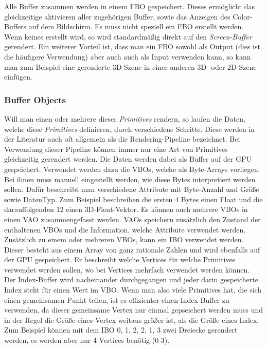 Alle Buffer zusammen werden in einem \ac{FBO} gespeichert. Dieses ermöglicht das gleichzeitige aktivieren aller zugehörigen Buffer, sowie das Anzeigen des Color-Buffers auf dem Bildschirm. Es muss nicht speziell ein \ac{FBO} erstellt werden. Wenn keines erstellt wird, so wird standardmäßig direkt auf den \textit{Screen-Buffer} gerendert. Ein weiterer Vorteil ist, dass man ein \ac{FBO} sowohl als Output (dies ist die häufigere Verwendung) aber auch auch als Input verwenden kann, so kann man zum Beispiel eine gerenderte 3D-Szene in einer anderen 3D- oder 2D-Szene einfügen.  

\subsubsection{Buffer Objects}
Will man einen oder mehrere dieser \textit{Primitives} rendern, so laufen die Daten, welche diese \textit{Primitives} definieren, durch verschiedene Schritte. Diese werden in der Literatur auch oft allgemein als die Rendering-Pipeline bezeichnet. Bei Verwendung dieser Pipeline können immer nur eine Art von Primitives gleichzeitig gerendert werden.
Die Daten werden dabei als Buffer auf der \ac{GPU} gespeichert. Verwendet werden dazu die \acp{VBO}, welche als Byte-Arrays vorliegen. Bei ihnen muss manuell eingestellt werden, wie diese Bytes interpretiert werden sollen. Dafür beschreibt man verschiedene Attribute mit Byte-Anzahl und Größe sowie DatenTyp. Zum Beispiel beschreiben die ersten 4 Bytes einen Float und die darauffolgenden 12 einen 3D-Float-Vektor. Es können auch mehrere \ac{VBO}s in einen \ac{VAO} zusammengefasst werden. \acp{VAO} speichern zusätzlich den Zustand der enthaltenen \acp{VBO} und die Information, welche Attribute verwendet werden. Zusätzlich zu einem oder mehreren \acp{VBO}, kann ein \ac{IBO} verwendet werden. Dieser besteht aus einem Array von ganz rationale Zahlen und wird ebenfalls auf der \ac{GPU} gespeichert. 
Er beschreibt welche Vertices für welche Primitives verwendet werden sollen, wo bei Vertices mehrfach verwendet werden können. Der Index-Buffer wird nacheinander durchgegangen und jeder darin gespeicherte Index steht für einen Wert im \ac{VBO}. Wenn man also viele Primitives hat, die sich einen gemeinsamen Punkt teilen, ist es effizienter einen Index-Buffer zu verwenden, da dieser gemeinsame Vertex nur einmal gepseichert werden muss und in der Regel die Größe eines Vertex weitaus größer ist, als die Größe eines Index. Zum Beispiel können mit dem \ac{IBO} { 0, 1, 2, 2, 1, 3} zwei Dreiecke gerendert werden, es werden aber nur 4 Vertices benötig (0-3).\cite{ThinMatrix}

